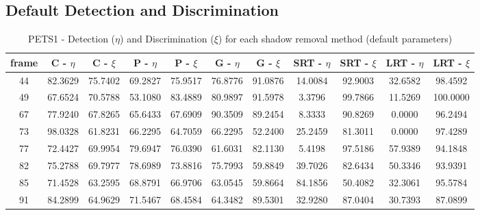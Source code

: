 \clearpage
\begin{appendices}



\chapter{Default Detection and Discrimination}

\begin{table}
\centering
\caption{PETS1 - Detection ($\eta$) and Discrimination ($\xi$) for each shadow removal method (default parameters)}
\begin{tabular}{ |c|c|c|c|c|c|c|c|c|c|c| }
	\hline
\textbf{frame} &  \textbf{C - $\eta$} &  \textbf{C - $\xi$} &  \textbf{P - $\eta$} &  \textbf{P - $\xi$} &  \textbf{G - $\eta$} &  \textbf{G - $\xi$} &  \textbf{SRT - $\eta$} &  \textbf{SRT - $\xi$} &  \textbf{LRT - $\eta$} &  \textbf{LRT - $\xi$} \\
\hline
\hline
44 & 82.3629 &  75.7402 &   69.2827 &  75.9517 &   76.8776 &  91.0876 &   14.0084 &  92.9003 &   32.6582 &  98.4592 \\
\hline
49 & 67.6524 &  70.5788 &   53.1080 &  83.4889 &   80.9897 &  91.5978 &   3.3796 &  99.7866 &   11.5269 &  100.0000 \\
\hline
67 & 77.9240 &  67.8265 &   65.6433 &  67.6909 &   90.3509 &  89.2454 &   8.3333 &  90.8269 &   0.0000 &  96.2494 \\
\hline
73 & 98.0328 &  61.8231 &   66.2295 &  64.7059 &   66.2295 &  52.2400 &   25.2459 &  81.3011 &   0.0000 &  97.4289 \\
\hline
77 & 72.4427 &  69.9954 &   79.6947 &  76.0390 &   61.6031 &  82.1130 &   5.4198 &  97.5186 &   57.9389 &  94.1848 \\
\hline
82 & 75.2788 &  69.7977 &   78.6989 &  73.8816 &   75.7993 &  59.8849 &   39.7026 &  82.6434 &   50.3346 &  93.9391 \\
\hline
85 & 71.4528 &  63.2595 &   68.8791 &  66.9706 &   63.0545 &  59.8664 &   84.1856 &  50.4082 &   32.3061 &  95.5784 \\
\hline
91 & 84.2899 &  64.9629 &   71.5467 &  68.4584 &   64.3482 &  89.5301 &   32.9280 &  87.0404 &   30.7393 &  87.0899 \\

\end{tabular}
\end{table}
\end{appendices}
